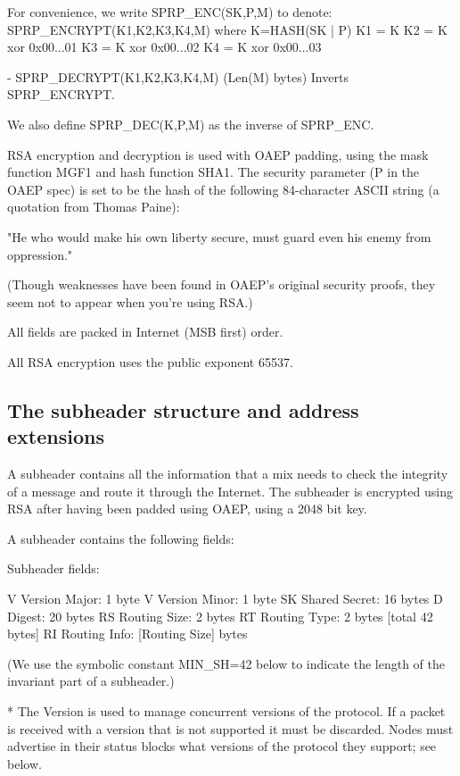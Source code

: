   For convenience, we write SPRP_ENC(SK,P,M) to denote:
       SPRP_ENCRYPT(K1,K2,K3,K4,M)
       where K=HASH(SK | P)
             K1 = K
             K2 = K xor 0x00...01
             K3 = K xor 0x00...02
             K4 = K xor 0x00...03

- SPRP_DECRYPT(K1,K2,K3,K4,M) (Len(M) bytes) Inverts SPRP_ENCRYPT.

  We also define SPRP_DEC(K,P,M) as the inverse of SPRP_ENC.

RSA encryption and decryption is used with OAEP padding, using the
mask function MGF1 and hash function SHA1.  The security parameter (P
in the OAEP spec) is set to be the hash of the following 84-character
ASCII string (a quotation from Thomas Paine):

     "He who would make his own liberty secure, must guard even his
      enemy from oppression." 

(Though weaknesses have been found in OAEP's original security proofs,
they seem not to appear when you're using RSA.)

All fields are packed in Internet (MSB first) order.

All RSA encryption uses the public exponent 65537.

\subsection{The subheader structure and address extensions}

A subheader contains all the information that a mix needs to check the
integrity of a message and route it through the Internet. The subheader
is encrypted using RSA after having been padded using OAEP, using a 2048
bit key. 

A subheader contains the following fields:

Subheader fields:

V   Version Major:   1 byte
V   Version Minor:   1 byte
SK  Shared Secret:   16 bytes
D   Digest:          20 bytes
RS  Routing Size:    2 bytes 
RT  Routing Type:    2 bytes [total 42 bytes]
RI  Routing Info:    [Routing Size] bytes

   (We use the symbolic constant MIN_SH=42 below to indicate the
   length of the invariant part of a subheader.)   

* The Version is used to manage concurrent versions of the
protocol. If a packet is received with a version that is not supported
it must be discarded. Nodes must advertise in their status blocks what
versions of the protocol they support; see below.

